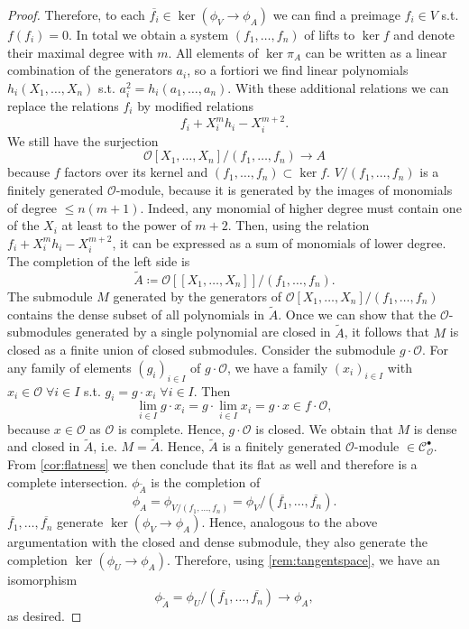 \documentclass{article}
\theoremstyle{plain}%
\theoremstyle{definition}
\theoremstyle{remark}
\newcommand{\cob}{\mathcal{C}_\mathcal{O}^\bullet}
\begin{document}
\begin{proof}
    Therefore, to each \(\overline{f_i}\in \ker(\phi_V \to \phi_A)\) we can find a preimage \(f_i \in V\) s.t.
    \(f(f_i) = 0\).
    In total we obtain a system \((f_1, \dots, f_n)\) of lifts to \(\ker f\) 
    and denote their maximal degree with \(m\).
    All elements of \(\ker \pi_A\) can be written as a linear combination of the generators \(a_i\), so a fortiori
    we find linear polynomials \(h_i(X_1, \dots, X_n)\) s.t. \(a_i^2 = h_i(a_1, \dots, a_n)\).
    With these additional relations we can replace the relations \(f_i\) by modified relations
    \[
        f_i + X_i^mh_i - X_i^{m+2}.  
    \]
    We still have the surjection 
    \[
        \mathcal{O}[X_1, \dots, X_n]/(f_1, \dots, f_n) \to A 
    \]
    because \(f\) factors over its kernel and \((f_1, \dots, f_n) \subset \ker f\).
    \(V/(f_1, \dots, f_n)\) is a finitely generated \(\mathcal{O}\)-module, 
    because it is generated by the images of monomials of degree \(\leq n(m+1)\). Indeed, any monomial
    of higher degree must contain one of the \(X_i\) at least to the power of \(m+2\). Then, using
    the relation \(f_i + X_i^mh_i - X_i^{m+2}\), it can be expressed as a sum of 
    monomials of lower degree.
    The completion of the left side is 
    \[
        \tilde A \coloneqq \mathcal{O}[[X_1, \dots, X_n]]/(f_1, \dots, f_n).
    \]
    The submodule \(M\) generated by the generators of \(\mathcal{O}[X_1, \dots, X_n]/(f_1, \dots, f_n)\) 
    contains the dense subset of all polynomials in \(\tilde A\).
    Once we can show that the \(\mathcal{O}\)-submodules generated by a single polynomial are closed in 
    \(\tilde A\), it follows that \(M\) is closed as a finite union of closed submodules. 
    Consider the submodule \(g \cdot \mathcal{O}\).
    For any family of elements \((g_i)_{i \in I}\) of \(g \cdot \mathcal{O}\), we have a family 
    \((x_i)_{i \in I}\) with \(x_i \in \mathcal{O} \; \forall i \in I\) s.t. \(g_i = g\cdot x_i \; \forall i \in I\).
    Then
    \[
        \lim\limits_{i\in I} g\cdot x_i = g \cdot \lim\limits_{i \in I} x_i = g \cdot x \in f \cdot \mathcal{O},
    \]
    because \(x \in \mathcal{O}\) as \(\mathcal{O}\) is complete. Hence, \(g\cdot \mathcal{O}\) is closed.
    We obtain that \(M\) is dense and closed in \(\tilde{A}\), i.e. \(M = \tilde{A}\).
    Hence, \(\tilde{A}\) is a finitely generated \(\mathcal{O}\)-module \(\in \cob\). 
    From \cref{cor:flatness} we then conclude that its flat as well and therefore
    is a complete intersection. \(\phi_{\tilde A}\) is the completion of 
    \[
        \phi_A = \phi_{V/(f_1, \dots, f_n)} = \phi_V/(\overline{f_1}, \dots, \overline{f_n}).
    \]
    \(\overline{f_1}, \dots, \overline{f_n}\) generate \(\ker (\phi_V \to \phi_A)\). Hence, analogous to the
    above argumentation with the closed and dense submodule, 
    they also generate the completion \(\ker (\phi_U \to \phi_A)\). 
    Therefore, using \cref{rem:tangentspace}, we have an isomorphism 
    \[
        \phi_{\tilde{A}} = \phi_U/(\overline{f_1}, \dots, \overline{f_n}) \to \phi_A,
    \]
    as desired.
\end{proof}
\end{document}
